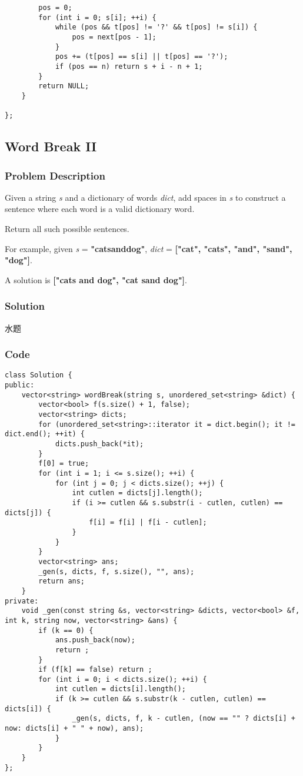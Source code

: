 \documentclass[courier]{article}
\begin{document}
\begin{CJK*}{UTF8}{gkai}
\begin{lstlisting}
        pos = 0;
        for (int i = 0; s[i]; ++i) {
            while (pos && t[pos] != '?' && t[pos] != s[i]) {
                pos = next[pos - 1];
            }
            pos += (t[pos] == s[i] || t[pos] == '?');
            if (pos == n) return s + i - n + 1;
        }
        return NULL;
    }
    
}; 
\end{lstlisting}


\subsection{ Word Break II }

\subsubsection*{Problem Description}
Given a string \emph{s} and a dictionary of words \emph{dict}, add spaces in \emph{s} to construct a sentence where each word is a valid dictionary word.

Return all such possible sentences.

For example, given
\emph{s} = \textbf{"catsanddog"},
\emph{dict} = \textbf{["cat", "cats", "and", "sand", "dog"]}.

A solution is \textbf{["cats and dog", "cat sand dog"]}.



\subsubsection*{Solution}
水题

\subsubsection*{Code}
\begin{lstlisting}
class Solution {
public:
    vector<string> wordBreak(string s, unordered_set<string> &dict) {
        vector<bool> f(s.size() + 1, false);
        vector<string> dicts;
        for (unordered_set<string>::iterator it = dict.begin(); it != dict.end(); ++it) {
            dicts.push_back(*it);
        }
        f[0] = true;
        for (int i = 1; i <= s.size(); ++i) {
            for (int j = 0; j < dicts.size(); ++j) {
                int cutlen = dicts[j].length();
                if (i >= cutlen && s.substr(i - cutlen, cutlen) == dicts[j]) {
                    f[i] = f[i] | f[i - cutlen];
                }
            }
        }
        vector<string> ans;
        _gen(s, dicts, f, s.size(), "", ans);
        return ans;
    }
private:
    void _gen(const string &s, vector<string> &dicts, vector<bool> &f, int k, string now, vector<string> &ans) {
        if (k == 0) {
            ans.push_back(now);
            return ;
        }
        if (f[k] == false) return ;
        for (int i = 0; i < dicts.size(); ++i) {
            int cutlen = dicts[i].length();
            if (k >= cutlen && s.substr(k - cutlen, cutlen) == dicts[i]) {
                _gen(s, dicts, f, k - cutlen, (now == "" ? dicts[i] + now: dicts[i] + " " + now), ans);
            }
        }
    }
}; 
\end{lstlisting}



\end{CJK*}
\end{document}
